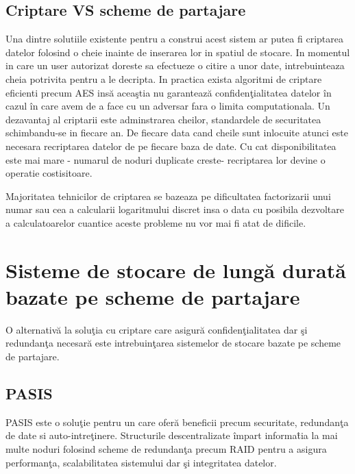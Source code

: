 \documentclass{llncs}
\newcommand{\todo}[1]{{\color{red}{TODO #1}}}
\begin{document}
\subsection{Criptare VS scheme de partajare}


Una dintre solutiile existente pentru a construi acest sistem ar putea fi criptarea datelor folosind o cheie inainte de inserarea lor in spatiul de stocare. In momentul in care un user autorizat doreste sa efectueze o citire a unor date, intrebuinteaza cheia potrivita pentru a le decripta.
In practica exista algoritmi de criptare eficienti precum AES ins\u{a} acea\c{s}tia nu garanteaz\u{a} confiden\c{t}ialitatea datelor \^{i}n cazul \^{i}n care avem de a face cu un adversar fara o limita computationala. Un dezavantaj al criptarii este adminstrarea cheilor, standardele de securitatea schimbandu-se in fiecare an.
De fiecare data cand cheile sunt inlocuite atunci este necesara recriptarea datelor de pe fiecare baza de date. Cu cat disponibilitatea este mai mare - numarul de noduri duplicate creste- recriptarea lor devine o operatie costisitoare. 

Majoritatea tehnicilor de criptarea se bazeaza pe dificultatea factorizarii unui numar sau cea a calcularii logaritmului discret insa o data cu posibila dezvoltare a calculatoarelor cuantice aceste probleme nu vor mai fi atat de dificile. \cite{Shor:1994}

\section{Sisteme de stocare de lung\u{a} durat\u{a} bazate pe scheme de partajare}

O alternativ\u{a} la solu\c{t}ia cu criptare care asigur\u{a} confiden\c{t}ialitatea dar \c{s}i redundan\c{t}a necesar\u{a} este intrebuin\c{t}area sistemelor de stocare bazate pe scheme de partajare. \cite{W:2000,SB:2005,SGMV:2009}


\subsection{PASIS}
\label{sec:desc_pasis}
PASIS este o solu\c{t}ie pentru un \todo{sistem descentralizat} care ofer\u{a} beneficii precum securitate, redundan\c{t}a de date si auto-intre\c{t}inere.
Structurile descentralizate \^{i}mpart informa\^{t}ia la mai multe noduri folosind scheme de redundan\c{t}a precum RAID pentru a asigura performan\c{t}a, scalabilitatea sistemului dar \c{s}i integritatea datelor. \cite{Patterson:1988}
\end{document}
